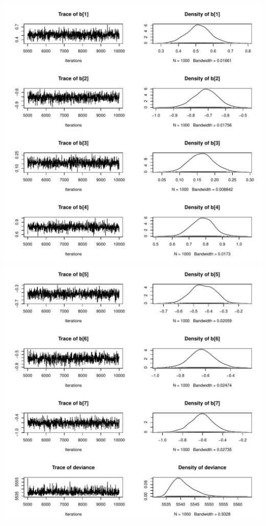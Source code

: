 \documentclass[
  11pt,
]{article}
\begin{document}
\includegraphics{Traceplot_LogisticReg1.pdf}
\includegraphics{Traceplot_LogisticReg2.pdf}
\end{document}
